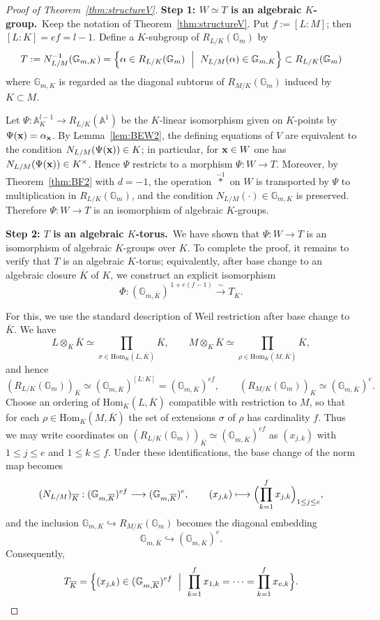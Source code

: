 \documentclass[a4paper, 11pt]{amsart}
\newcommand{\A}{\mathbb A}
\newcommand{\Hom}{\mathrm{Hom}}
\theoremstyle{plain}
\theoremstyle{definition}
\numberwithin{equation}{section}
\begin{document}
\begin{proof}[Proof of Theorem~\ref{thm:structureV}]
\quad\par
{\bf Step 1: $W\simeq T$ is an algebraic $K$-group.}\ Keep the notation of Theorem~\ref{thm:structureV}. 
Put $f:=[L:M]$; then $[L:K]=ef=l-1$.
Define a $K$-subgroup of $R_{L/K}(\mathbb{G}_m)$ by
\[
T:=N_{L/M}^{-1}(\mathbb{G}_{m,K})=\Bigl\{\alpha\in R_{L/K}(\mathbb{G}_m)\ \Bigm|\ N_{L/M}(\alpha)\in \mathbb{G}_{m,K}\Bigr\}\subset R_{L/K}(\mathbb{G}_m)
\]
where $\mathbb{G}_{m,K}$ is regarded as the diagonal subtorus of $R_{M/K}(\mathbb{G}_m)$ induced by $K \subset M$.

Let $\Psi:\A^{l-1}_K\to R_{L/K}(\A^1)$ be the $K$-linear isomorphism given on $K$-points by $\Psi({\bf x})=\alpha_{\bf x}$.
By Lemma~\ref{lem:BEW2}, the defining equations of $V$ are equivalent to the condition $N_{L/M}(\Psi({\bf x}))\in K$; in particular, for ${\bf x}\in W$ one has $N_{L/M}(\Psi({\bf x}))\in K^\times$.
Hence $\Psi$ restricts to a morphism $\Psi:W\to T$.
Moreover, by Theorem~\ref{thm:BF2} with $d=-1$, the operation $\overset{-1}{\ast}$ on $W$ is transported by $\Psi$ to multiplication in $R_{L/K}(\mathbb{G}_m)$, and the condition $N_{L/M}(\cdot)\in \mathbb{G}_{m,K}$ is preserved. 
Therefore $\Psi:W\to T$ is an isomorphism of algebraic $K$-groups.
\quad\par
{\bf Step 2: $T$ is an algebraic $K$-torus.}\ We have shown that $\Psi:W\to T$ is an isomorphism of algebraic $K$-groups over $K$.
To complete the proof, it remains to verify that $T$ is an algebraic $K$-torus; equivalently, after base change to an algebraic closure $\overline{K}$ of $K$, we construct an explicit isomorphism
\[
\Phi:(\mathbb{G}_{m,\overline{K}})^{\,1+e(f-1)} \xrightarrow{\ \sim\ } T_{\overline{K}}.
\]

For this, we use the standard description of Weil restriction after base change to $\overline{K}$.
We have
\[
L\otimes_K \overline{K}\simeq \prod_{\sigma\in\Hom_K(L, \overline{K})} \overline{K},\qquad
M\otimes_K \overline{K}\simeq \prod_{\rho\in\Hom_K(M, \overline{K})} \overline{K},
\]
and hence
\[
(R_{L/K}(\mathbb{G}_m))_{ \overline{K}}\simeq (\mathbb{G}_{m, \overline{K}})^{[L:K]}=(\mathbb{G}_{m, \overline{K}})^{ef},\qquad
(R_{M/K}(\mathbb{G}_m))_{ \overline{K}}\simeq (\mathbb{G}_{m, \overline{K}})^{e}.
\]
Choose an ordering of $\Hom_K(L, \overline{K})$ compatible with restriction to $M$, so that for each $\rho\in\Hom_K(M, \overline{K})$ the set of extensions $\sigma$ of $\rho$ has cardinality $f$.
Thus we may write coordinates on $(R_{L/K}(\mathbb{G}_m))_{ \overline{K}}\simeq (\mathbb{G}_{m, \overline{K}})^{ef}$ as $(x_{j,k})$ with $1\le j\le e$ and $1\le k\le f$.
Under these identifications, the base change of the norm map becomes
\[
(N_{L/M})_{ \overline{K}}:(\mathbb{G}_{m, \overline{K}})^{ef}\longrightarrow (\mathbb{G}_{m, \overline{K}})^e,\qquad
(x_{j,k})\longmapsto \Bigl(\prod_{k=1}^f x_{j,k}\Bigr)_{1\le j\le e},
\]
and the inclusion $\mathbb{G}_{m,K}\hookrightarrow R_{M/K}(\mathbb{G}_m)$ becomes the diagonal embedding
\[
\mathbb{G}_{m, \overline{K}}\hookrightarrow (\mathbb{G}_{m, \overline{K}})^e.
\]
Consequently,
\[
T_{ \overline{K}}
=\Bigl\{(x_{j,k})\in(\mathbb{G}_{m, \overline{K}})^{ef}\ \Bigm|\ \prod_{k=1}^f x_{1,k}=\cdots=\prod_{k=1}^f x_{e,k}\Bigr\}.
\]


\end{proof}
\end{document}
